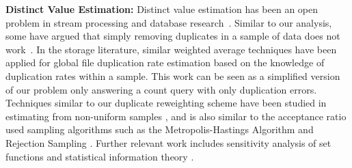 \vspace{.5em}

{\noindent \bf Distinct Value Estimation:}
Distinct value estimation has been an open problem in stream processing and database research~\cite{considine2004approximate,bar2002counting,haas1995sampling,beyer2007synopses}.
Similar to our analysis, some have argued that simply removing duplicates in a sample of data does not work~\cite{charikar2000towards}.
In the storage literature, similar weighted average techniques have been applied for global file duplication rate estimation \cite{harnik2012estimation} based on the knowledge of duplication rates within a sample.
This work can be seen as a simplified version of our problem only answering a count query with only duplication errors.
Techniques similar to our duplicate reweighting scheme have been studied in estimating from non-uniform samples \cite{aldroubi2002non}, and is also similar to the acceptance ratio used sampling algorithms such as the Metropolis-Hastings Algorithm and Rejection Sampling \cite{liu1996metropolized,metropolis1953equation}.
Further relevant work includes sensitivity analysis of set functions \cite{mcdiarmid1989method, jukna2012analysis} and statistical information theory \cite{kullback1997information}. 
